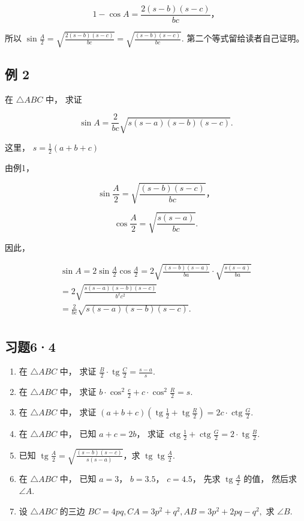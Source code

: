 \[
1 - \cos A = \frac {2 (s - b) (s - c)}{b c}\text{，}
\]

所以
\(\sin \frac{A}{2} = \sqrt{\frac{2(s - b)(s - c)}{bc}} = \sqrt{\frac{(s - b)(s - c)}{bc}}.\)
第二个等式留给读者自己证明。

\subsection{例 2}

在 \(\triangle ABC\) 中， 求证

\[
\sin A = \frac {2}{b c} \sqrt {s (s - a) (s - b) (s - c)}.
\]

这里， \(s = \frac{1}{2} (a + b + c)\)

 由例1，

\[
\sin \frac {A}{2} = \sqrt {\frac {(s - b) (s - c)}{b c}}\text{，}
\]

\[
\cos \frac {A}{2} = \sqrt {\frac {s (s - a)}{b c}}.
\]

因此，

\[
\begin{array}{l} \sin A = 2 \sin \frac {A}{2} \cos \frac {A}{2} = 2 \sqrt {\frac {(s - b) (s - a)}{b a}} \cdot \sqrt {\frac {s (s - a)}{b a}} \\ = 2 \sqrt {\frac {s (s - a) (s - b) (s - c)}{b ^ {2} c ^ {2}}} \\ = \frac {2}{b c} \sqrt {s (s - a) (s - b) (s - c)}. \\ \end{array}
\]

\subsection{习题6·4}

\begin{enumerate}
\item
  在 \(\triangle ABC\) 中， 求证
  \(\frac{B}{2} \cdot \operatorname{tg} \frac{C}{2} = \frac{s - a}{s}\).
\item
  在 \(\triangle ABC\) 中， 求证
  \(b \cdot \cos^2 \frac{c}{2} + c \cdot \cos^2 \frac{R}{2} = s\).
\item
  在 \(\triangle ABC\) 中， 求证
  \((a + b + c)\left(\operatorname{tg} \frac{1}{2} + \operatorname{tg} \frac{R}{2}\right) = 2c \cdot \operatorname{ctg} \frac{G}{2}\).
\item
  在 \(\triangle ABC\) 中， 已知 \(a + c = 2b\)， 求证
  \(\operatorname{ctg} \frac{1}{2} + \operatorname{ctg} \frac{G}{2} = 2 \cdot \operatorname{tg} \frac{B}{2}\).
\item
  已知
  \(\operatorname{tg} \frac{A}{2} = \sqrt{\frac{(s - b)(s - c)}{s(s - a)}}\)，求
  \(\operatorname{tg} \operatorname{tg} \frac{A}{2}\).
\item
  在 \(\triangle ABC\) 中， 已知 \(a = 3\)， \(b = 3.5\)， \(c = 4.5\)，
  先求 \(\operatorname{tg} \frac{A}{2}\) 的值， 然后求 \(\angle A\).
\item
  设 \(\triangle ABC\) 的三边
  \(BC = 4pq, CA = 3p^2 + q^2, AB = 3p^2 + 2pq - q^2,\) 求 \(\angle B\).
\end{enumerate}

